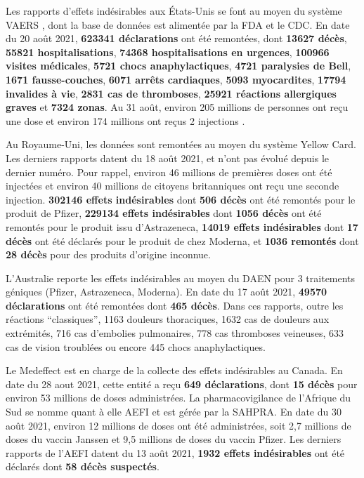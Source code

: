 \documentclass[a4paper]{article}
\begin{document}
\begin{multicols}{3}
  Les rapports d'effets indésirables aux États-Unis se font au moyen
  du système VAERS \cite{OpenVaers}, dont la base de données est
  alimentée par la FDA et le CDC. En date du 20 août 2021,
  \textbf{623341 déclarations} ont été remontées, dont \textbf{13627
    décès}, \textbf{55821 hospitalisations}, \textbf{74368
    hospitalisations en urgences}, \textbf{100966 visites médicales},
  \textbf{5721 chocs anaphylactiques}, \textbf{4721 paralysies de
    Bell}, \textbf{1671 fausse-couches}, \textbf{6071 arrêts
    cardiaques}, \textbf{5093 myocardites}, \textbf{17794 invalides à
    vie}, \textbf{2831 cas de thromboses}, \textbf{25921 réactions
    allergiques graves} et \textbf{7324 zonas}. Au 31 août, environ
  205 millions de personnes ont reçu une dose et environ 174 millions
  ont reçus 2 injections \cite{UsaFacts}.

  Au Royaume-Uni, les données sont remontées au moyen du système
  Yellow Card\cite{YellowCardReport}. Les derniers rapports datent du
  18 août 2021, et n'ont pas évolué depuis le dernier numéro. Pour
  rappel, environ 46 millions de premières doses ont été injectées et
  environ 40 millions de citoyens britanniques ont reçu une seconde
  injection. \textbf{302146 effets indésirables} dont \textbf{506
    décès} ont été remontés pour le produit de Pfizer, \textbf{229134
    effets indésirables} dont \textbf{1056 décès} ont été remontés
  pour le produit issu d'Astrazeneca, \textbf{14019 effets
    indésirables} dont \textbf{17 décès} ont été déclarés pour le
  produit de chez Moderna, et \textbf{1036 remontés} dont \textbf{28
    décès} pour des produits d'origine inconnue.

  L'Australie reporte les effets indésirables au moyen du DAEN
  \cite{Australia:DAEN} pour 3 traitements géniques (Pfizer,
  Astrazeneca, Moderna). En date du 17 août 2021, \textbf{49570
    déclarations} ont été remontées dont \textbf{465 décès}. Dans ces
  rapports, outre les réactions “classiques”, 1163 douleurs
  thoraciques, 1632 cas de douleurs aux extrémités, 716 cas d'embolies
  pulmonaires, 778 cas thromboses veineuses, 633 cas de vision
  troublées ou encore 445 chocs anaphylactiques.

  Le Medeffect \cite{Canada:CVAROD} est en charge de la collecte des
  effets indésirables au Canada. En date du 28 aout 2021, cette entité
  a reçu \textbf{649 déclarations}, dont \textbf{15 décès} pour
  environ 53 millions de doses administrées. La pharmacovigilance de
  l'Afrique du Sud se nomme quant à elle AEFI \cite{SouthAfrica:AEFI}
  et est gérée par la SAHPRA.  En date du 30 août 2021, environ 12
  millions de doses ont été administrées, soit 2,7 millions de doses
  du vaccin Janssen et 9,5 millions de doses du vaccin Pfizer. Les
  derniers rapports de l'AEFI datent du 13 août 2021, \textbf{1932
    effets indésirables} ont été déclarés dont \textbf{58 décès
    suspectés}.


\end{multicols}
\end{document}
